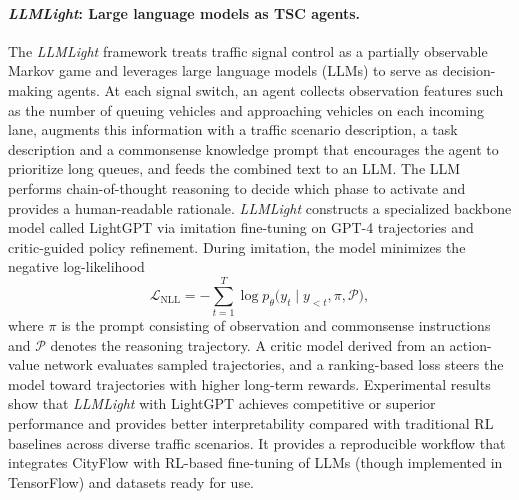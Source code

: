 \paragraph{\textit{LLMLight}: Large language models as TSC agents.}
The \textit{LLMLight}\cite{lai2024llmlightlargelanguagemodels} framework treats traffic signal control as a partially observable Markov game and leverages large language models (LLMs) to serve as decision-making agents. At each signal switch, an agent collects observation features such as the number of queuing vehicles and approaching vehicles on each incoming lane, augments this information with a traffic scenario description, a task description and a commonsense knowledge prompt that encourages the agent to prioritize long queues, and feeds the combined text to an LLM. The LLM performs chain-of-thought reasoning to decide which phase to activate and provides a human-readable rationale. \textit{LLMLight} constructs a specialized backbone model called LightGPT via imitation fine-tuning on GPT-4 trajectories and critic-guided policy refinement. During imitation, the model minimizes the negative log-likelihood
\begin{equation*}
\mathcal{L}_{\mathrm{NLL}} = - \sum_{t=1}^{T} \log p_\theta \bigl( y_t \mid y_{<t}, \pi, \mathcal{P} \bigr),
\end{equation*}
where $\pi$ is the prompt consisting of observation and commonsense instructions and $\mathcal{P}$ denotes the reasoning trajectory. A critic model derived from an action-value network evaluates sampled trajectories, and a ranking-based loss steers the model toward trajectories with higher long-term rewards. Experimental results show that \textit{LLMLight} with LightGPT achieves competitive or superior performance and provides better interpretability compared with traditional RL baselines across diverse traffic scenarios. It provides a reproducible workflow that integrates CityFlow with RL-based fine-tuning of LLMs (though implemented in TensorFlow) and datasets ready for use.

